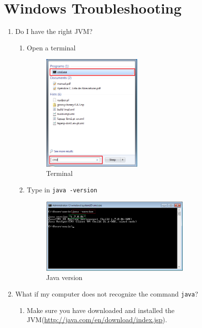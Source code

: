 \section{Windows Troubleshooting}\label{sec:win}

\begin{enumerate}
	\item Do I have the right JVM?
	\begin{enumerate}
		\item Open a terminal
		\begin{figure}[H]\label{fig:terminal}
		\centering
		\includegraphics[width=0.5\textwidth]{img/step-by-step-win/1-open-cmd}
		\caption{Terminal}
		\end{figure}
		
		\item Type in {\tt java -version}
		\begin{figure}[H]\label{fig:version}
		\centering
		\includegraphics[width=0.75\textwidth]{img/step-by-step-win/2-java-version}
		\caption{Java version}
		\end{figure}
		
	\end{enumerate}
	
	\item What if my computer does not recognize the command {\tt java}?
	\begin{enumerate}
		\item Make sure you have downloaded and installed the JVM(\url{http://java.com/en/download/index.jsp}). 
	\end{enumerate}
	

\end{enumerate}

